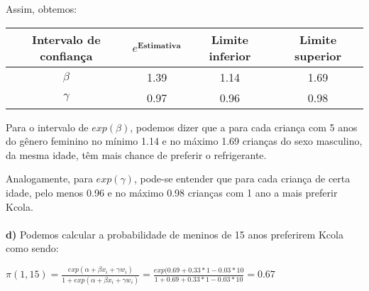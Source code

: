 \documentclass[10pt,a4paper]{article}
\begin{document}
Assim, obtemos:

\begin{center}
	\begin{tabular}{| c | c c c |}
	\hline
	Intervalo de confiança & $e^{\textbf{Estimativa}}$ & Limite inferior & Limite superior \\
	\hline
	$\beta$ & 1.39 & 1.14 & 1.69 \\
	\hline
	$\gamma$ & 0.97 & 0.96 & 0.98 \\
	\hline
	\end{tabular}
\end{center}

Para o intervalo de $exp(\beta)$, podemos dizer que a para cada criança com 5 anos do gênero feminino no mínimo 1.14 e no máximo 1.69 crianças do sexo masculino, da mesma idade, têm mais chance de preferir o refrigerante. 

Analogamente, para $exp(\gamma)$, pode-se entender que para cada criança de certa idade, pelo menos 0.96 e no máximo 0.98 crianças com 1 ano a mais preferir Kcola. \\ \\

\textbf{d)} Podemos calcular a probabilidade de meninos de 15 anos preferirem Kcola como sendo: 

$\pi(1,15) = \displaystyle\frac{exp(\alpha + \beta x_i + \gamma w_i)}{1 + exp(\alpha + \beta x_i + \gamma w_i)} = \displaystyle\frac{exp(0.69 + 0.33 * 1 - 0.03 * 10}{1 + 0.69 + 0.33 * 1 - 0.03 * 10} = 0.67$
\end{document}
